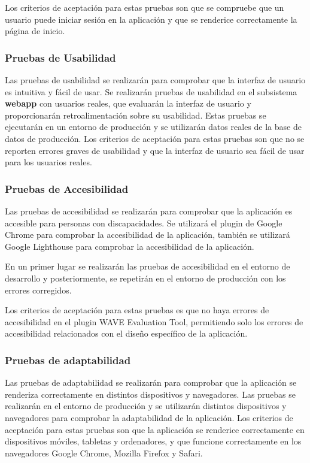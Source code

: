 Los criterios de aceptación para estas pruebas son que se compruebe que un usuario puede iniciar sesión en la aplicación y que se renderice correctamente la página de inicio.

\subsubsection{Pruebas de Usabilidad}
Las pruebas de usabilidad se realizarán para comprobar que la interfaz de usuario es intuitiva y fácil de usar.
Se realizarán pruebas de usabilidad en el subsistema \textbf{webapp} con usuarios reales, que evaluarán la interfaz de usuario y proporcionarán retroalimentación sobre su usabilidad.
Estas pruebas se ejecutarán en un entorno de producción y se utilizarán datos reales de la base de datos de producción.
Los criterios de aceptación para estas pruebas son que no se reporten errores graves de usabilidad y que la interfaz de usuario sea fácil de usar para los usuarios reales.

\subsubsection{Pruebas de Accesibilidad}
Las pruebas de accesibilidad se realizarán para comprobar que la aplicación es accesible para personas con discapacidades.
Se utilizará el plugin de Google Chrome 
 para comprobar la accesibilidad de la aplicación,
también se utilizará Google Lighthouse para comprobar la accesibilidad de la aplicación.

En un primer lugar se realizarán las pruebas de accesibilidad en el entorno de desarrollo y posteriormente, se repetirán en el entorno de producción con los errores corregidos.

Los criterios de aceptación para estas pruebas es que no haya errores de accesibilidad en el plugin WAVE Evaluation Tool,
permitiendo solo los errores de accesibilidad relacionados con el diseño específico de la aplicación.


\subsubsection{Pruebas de adaptabilidad}
Las pruebas de adaptabilidad se realizarán para comprobar que la aplicación se renderiza correctamente en distintos dispositivos y navegadores.
Las pruebas se realizarán en el entorno de producción y se utilizarán distintos dispositivos y navegadores para comprobar la adaptabilidad de la aplicación.
Los criterios de aceptación para estas pruebas son que la aplicación se renderice correctamente en dispositivos móviles, tabletas y ordenadores, y que funcione correctamente en los navegadores Google Chrome, Mozilla Firefox y Safari.


